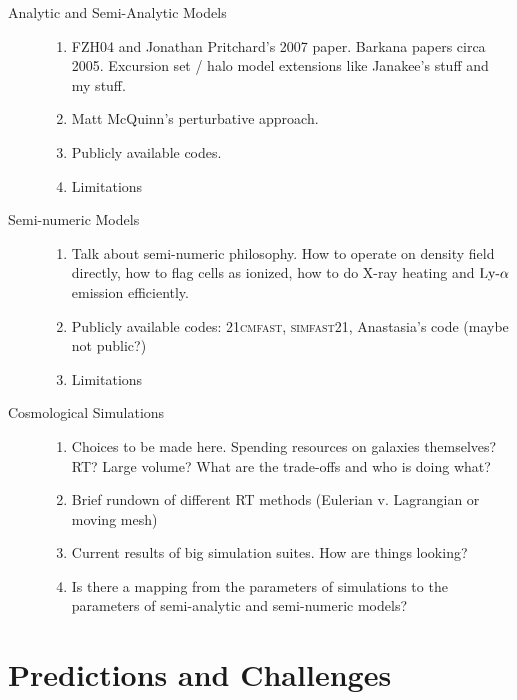 \documentclass[letterpaper,titlepage,12pt]{article}
\begin{document}
\begin{description}
  \item[Analytic and Semi-Analytic Models] \hfill
  \begin{enumerate}
      \item FZH04 and Jonathan Pritchard's 2007 paper. Barkana papers circa 2005. Excursion set / halo model extensions like Janakee's stuff and my stuff.
      \item Matt McQuinn's perturbative approach.
      \item Publicly available codes.
      \item Limitations
  \end{enumerate}
  
  \item[Semi-numeric Models] \hfill
  \begin{enumerate}
      \item Talk about semi-numeric philosophy. How to operate on density field directly, how to flag cells as ionized, how to do X-ray heating and $\text{Ly-}\alpha$ emission efficiently.
      \item Publicly available codes: \textsc{21cmfast}, \textsc{simfast21}, Anastasia's code (maybe not public?)
      \item Limitations
  \end{enumerate}

  \item[Cosmological Simulations] \hfill
  \begin{enumerate}
      \item Choices to be made here. Spending resources on galaxies themselves? RT? Large volume? What are the trade-offs and who is doing what?
      \item Brief rundown of different RT methods (Eulerian v. Lagrangian or moving mesh)
      \item Current results of big simulation suites. How are things looking?
      \item Is there a mapping from the parameters of simulations to the parameters of semi-analytic and semi-numeric models?
  \end{enumerate}
  
\end{description}

\section{Predictions and Challenges} \label{sec:predictions} \vspace{-12pt}
\end{document}
